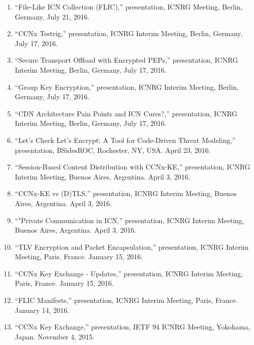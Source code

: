 \documentclass[10pt]{res} %
\begin{document}
\begin{resume}
\vspace{18pt}

\begin{enumerate}[T-1.]

\item ``File-Like ICN Collection (FLIC),'' presentation, ICNRG Meeting, Berlin, Germany, July 21, 2016.

\item ``CCNx Testrig,'' presentation, ICNRG Interim Meeting, Berlin, Germany, July 17, 2016.

\item ``Secure Transport Offload with Encrypted PEPs,'' presentation, ICNRG Interim Meeting, Berlin, Germany, July 17, 2016.

\item ``Group Key Encryption,'' presentation, ICNRG Interim Meeting, Berlin, Germany, July 17, 2016.

\item ``CDN Architecture Pain Points and ICN Cures?,'' presentation, ICNRG Interim Meeting, Berlin, Germany, July 17, 2016.

\item ``Let's Check Let's Encrypt: A Tool for Code-Driven Threat Modeling,'' presentation, BSidesROC, Rochester, NY, USA. April 23, 2016.

\item ``Session-Based Content Distribution with CCNx-KE,'' presentation, ICNRG Interim Meeting, Buenos Aires, Argentina. April 3, 2016.

\item ``CCNx-KE vs (D)TLS,'' presentation, ICNRG Interim Meeting, Buenos Aires, Argentina. April 3, 2016.

\item ``"Private Communication in ICN,'' presentation, ICNRG Interim Meeting, Buenos Aires, Argentina. April 3, 2016.

\item ``TLV Encryption and Packet Encapsulation,'' presentation, ICNRG Interim Meeting, Paris, France. January 15, 2016.

\item ``CCNx Key Exchange - Updates,'' presentation, ICNRG Interim Meeting, Paris, France. January 15, 2016.

\item ``FLIC Manifests,'' presentation, ICNRG Interim Meeting, Paris, France. January 14, 2016.

\item ``CCNx Key Exchange,'' presentation, IETF 94 ICNRG Meeting, Yokohama, Japan. November 4, 2015.


\end{enumerate}
\end{resume}
\end{document}
